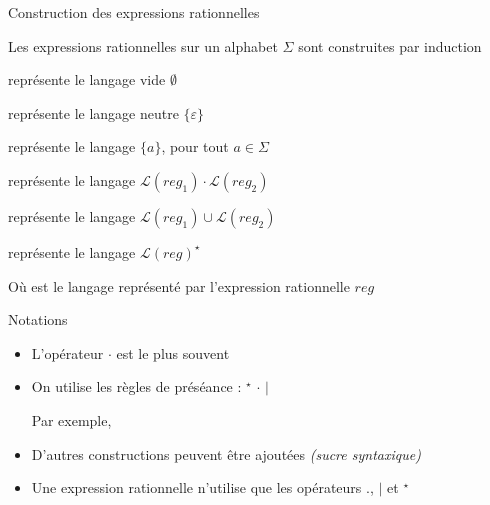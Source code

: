 
\begingroup

\begin{frame}{Construction des expressions rationnelles}
  
  Les expressions rationnelles sur un alphabet $\Sigma$ sont construites par induction
  
  \begin{description}[xxxxxxxxxxx]
  \item[$\emptyset$ :] représente le langage vide \alert{$\emptyset$}
  \item[$\varepsilon$ :] représente le langage neutre \alert{$\{\varepsilon\}$}
  \item[$a$ :] représente le langage \alert{$\{a\}$}, pour tout $a\in \Sigma$
  \item[$\mathit{reg}_1 \cdot \mathit{reg}_2$ :] représente le langage \alert{$\mathcal{L}(\mathit{reg}_1) \cdot \mathcal{L}(\mathit{reg}_2)$}
  \item[$\mathit{reg}_1 \mid \mathit{reg}_2$ :] représente le langage \alert{$\mathcal{L}(\mathit{reg}_1) \cup \mathcal{L}(\mathit{reg}_2)$}
  \item[$\mathit{reg}^\star$ :] représente le langage \alert{$\mathcal{L}(\mathit{reg})^\star$}
  \end{description}

  Où  est le langage représenté par l'expression rationnelle $\mathit{reg}$

  \pause
  \begin{block}{Notations}
    \begin{itemize}
    \item L'opérateur \alert{$\cdot$} est le plus souvent 
    \item On utilise les règles de \alert{préséance} : \quad
       \alert{${}^\star$} \quad
       \alert{$\cdot$}   \quad
       \alert{$|$}
      \begin{center}
        Par exemple, 
      \end{center}
    \item D'autres constructions peuvent être ajoutées \emph{(sucre syntaxique)}
      \begin{center}
         \quad\quad
      \end{center}
    \item Une expression rationnelle  n'utilise que les opérateurs \alert{$.$}, \alert{$|$} et \alert{${}^\star$}
    \end{itemize}
  \end{block}
  
\end{frame}

\endgroup
